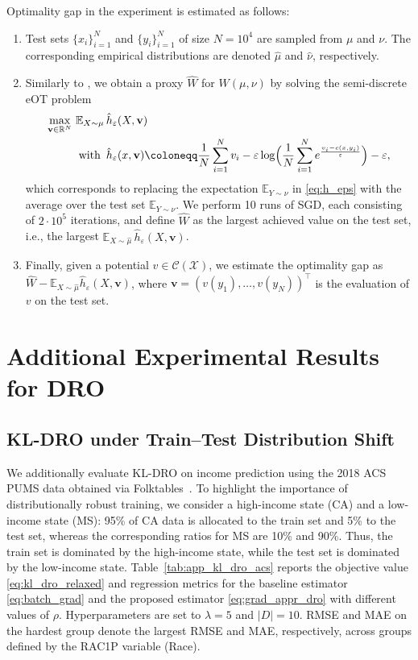 \documentclass{article}
\newcommand{\R}{\mathbb{R}}
\newcommand{\E}{\mathbb{E}}
\newcommand*{\eqset}{\coloneqq}
\def\cX{\mathcal{X}}
\theoremstyle{plain}
\theoremstyle{definition}
\theoremstyle{remark}
\begin{document}
Optimality gap in the experiment is estimated as follows:
\begin{enumerate}
    \item Test sets \(\{x_i\}_{i=1}^N \) and \(\{y_i\}_{i=1}^N \) of size $N=10^4$ are sampled from \(\mu\) and \(\nu\). The corresponding empirical distributions are denoted \(\hat{\mu}\) and \(\hat{\nu}\), respectively.
    \item Similarly to \cite{genevay2016stochastic}, we obtain a proxy $\hat{W}$ for $W(\mu,\nu)$ by solving the semi-discrete eOT problem
    \begin{align*}
        \max_{\mathbf{v} \in \R^N}\, \E_{X \sim \mu}\, & \hat{h}_{\varepsilon}(X, \mathbf{v}) \\
        \text{with }\, & \hat{h}_{\varepsilon}(x, \mathbf{v}) \eqset \frac{1}{N}\sum_{i=1}^N v_i -\varepsilon \log \Bigl(\frac{1}{N}\sum_{i=1}^N e^{\frac{v_i - c(x,y_i)}{\varepsilon}} \Bigr)-\varepsilon,
    \end{align*}
    which corresponds to replacing the expectation $\E_{Y \sim \nu}$ in \eqref{eq:h_eps} with the average over the test set $\E_{Y \sim \hat{\nu}}$.
    We perform 10 runs of SGD, each consisting of $2 \cdot 10^5$ iterations, and define $\hat{W}$ as the largest achieved value on the test set, i.e., the largest $\E_{X \sim \hat{\mu}}\, \hat{h}_{\varepsilon}(X, \mathbf{v})$.
    \item Finally, given a potential $v \in \mathcal{C}(\cX)$, we estimate the optimality gap as
    $\hat{W} - \E_{X \sim \hat{\mu}} \hat{h}_{\varepsilon}(X, \mathbf{v})$, where $\mathbf{v}=(v(y_1), \ldots, v(y_N))^\top$ is the evaluation of $v$ on the test set.
\end{enumerate}


\section{Additional Experimental Results for DRO}\label{app:dro}

\subsection{KL-DRO under Train--Test Distribution Shift}\label{app:kl_dro}

We additionally evaluate KL-DRO on income prediction using the 2018 ACS PUMS data obtained via Folktables~\cite{ding2021retiring}. To highlight the importance of distributionally robust training, we consider a high-income state (CA) and a low-income state (MS): 95\% of CA data is allocated to the train set and 5\% to the test set, whereas the corresponding ratios for MS are 10\% and 90\%. Thus, the train set is dominated by the high-income state, while the test set is dominated by the low-income state. Table~\ref{tab:app_kl_dro_acs} reports the objective value \eqref{eq:kl_dro_relaxed} and regression metrics for the baseline estimator \eqref{eq:batch_grad} and the proposed estimator \eqref{eq:grad_appr_dro} with different values of $\rho$. Hyperparameters are set to $\lambda=5$ and $|D|=10$. RMSE and MAE on the hardest group denote the largest RMSE and MAE, respectively, across groups defined by the RAC1P variable (Race).
\end{document}
